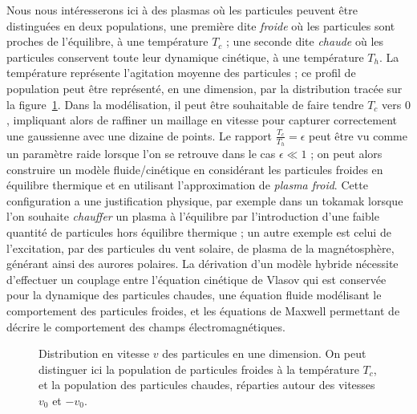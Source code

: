 Nous nous intéresserons ici à des plasmas où les particules peuvent être distinguées en deux populations, une première dite \emph{froide} où les particules sont proches de l'équilibre, à une température $T_c$ ; une seconde dite \emph{chaude} où les particules conservent toute leur dynamique cinétique, à une température $T_h$. La température représente l'agitation moyenne des particules ; ce profil de population peut être représenté, en une dimension, par la distribution tracée sur la figure~\ref{fig:intro:distrib}. Dans la modélisation, il peut être souhaitable de faire tendre $T_c$ vers $0$, impliquant alors de raffiner un maillage en vitesse pour capturer correctement une gaussienne avec une dizaine de points. Le rapport $\frac{T_c}{T_h}=\epsilon$ peut être vu comme un paramètre raide lorsque l'on se retrouve dans le cas $\epsilon \ll 1$ ; on peut alors construire un modèle fluide/cinétique en considérant les particules froides en équilibre thermique et en utilisant l'approximation de \emph{plasma froid}. Cette configuration a une justification physique, par exemple dans un tokamak lorsque l'on souhaite \emph{chauffer} un plasma à l'équilibre par l'introduction d'une faible quantité de particules hors équilibre thermique ; un autre exemple est celui de l’excitation, par des particules du vent solaire, de plasma de la magnétosphère, générant ainsi des aurores polaires. La dérivation d'un modèle hybride nécessite d'effectuer un couplage entre l'équation cinétique de Vlasov qui est conservée pour la dynamique des particules chaudes, une équation fluide modélisant le comportement des particules froides, et les équations de Maxwell permettant de décrire le comportement des champs électromagnétiques. 

\begin{figure}[h]
  \centering
  
  \caption{Distribution en vitesse $v$ des particules en une dimension. On peut distinguer ici la population de particules froides à la température $T_c$, et la population des particules chaudes, réparties autour des vitesses $v_0$ et $-v_0$.}
  \label{fig:intro:distrib}
\end{figure}
